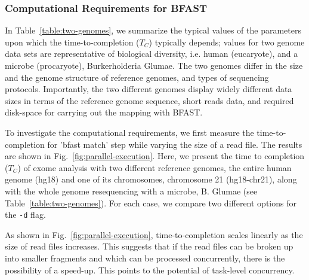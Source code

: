 \documentclass{cpeauth}
\begin{document}


\subsubsection{Computational Requirements for BFAST}


In Table~\ref{table:two-genomes}, we summarize the typical values of
the parameters upon which the time-to-completion ($T_C$) typically
depends; values for two genome data sets are representative of
biological diversity, i.e. human (eucaryote), and a microbe (procaryote),
Burkerholderia Glumae\cite{kim2011}.  The two genomes differ
in the size and the genome structure of reference genomes, and types
of sequencing protocols.  Importantly, the two different genomes
display widely different data sizes in terms of the reference genome
sequence, short reads data, and required disk-space for carrying out
the mapping with BFAST.


To investigate the computational requirements, we first measure the
time-to-completion for 'bfast match' step while varying the size of a
read file.  The results are shown in
Fig.~\ref{fig:parallel-execution}. %
Here, we present the time to completion ($T_C$) of exome analysis with
two different reference genomes, the entire human genome (hg18) and
one of its chromosomes, chromosome 21 (hg18-chr21), along with the whole genome
resequencing with a microbe, B. Glumae\cite{kim2011} (see Table~\ref{table:two-genomes}).  For
each case, we compare two different options for the \texttt{-d} flag.

As shown in Fig.~\ref{fig:parallel-execution}, time-to-completion 
scales linearly as the size of read files increases.
This suggests that if the read files can be broken up into smaller
fragments and which can be processed concurrently, there is the
possibility of a speed-up. This points to the potential of task-level
concurrency.
\end{document}
